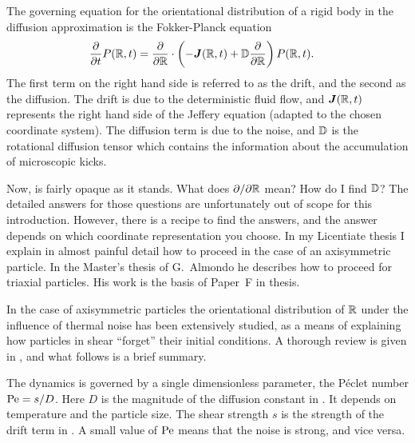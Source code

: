 \documentclass[thesis.tex]{subfiles}
\begin{document}
The governing equation for the orientational distribution of a rigid body in the diffusion approximation is the Fokker-Planck equation
\begin{align}
	\frac{\partial}{\partial t}P(\ma R, t) &= \frac{\partial}{\partial \ma R}\cdot\left(
	-\ve J (\ma R, t) + \ma D\frac{\partial}{\partial \ma R}\right)P(\ma R, t).\eqnlab{fpejeff}
\end{align}
The first term on the right hand side is referred to as the drift, and the second as the diffusion. The drift is due to the deterministic fluid flow, and $\mbox{\boldmath$J$}(\mathbb{R}, t)$ represents the right hand side of the Jeffery equation  (adapted to the chosen coordinate system). The diffusion term is due to the noise, and $\mathbb{D}$ is the rotational diffusion tensor which contains the information about the accumulation of microscopic kicks.

Now,  is fairly opaque as it stands. What does $\partial/\partial \mathbb{R}$ mean? How do I find $\mathbb{D}$? The detailed answers for those questions are unfortunately out of scope for this introduction. However, there is a recipe to find the answers, and the answer depends on which coordinate representation you choose. In my Licentiate thesis \cite{lic} I explain in almost painful detail how to proceed in the case of an axisymmetric particle. In the Master's thesis of G.~Almondo \cite{gino} he describes how to proceed for triaxial particles. His work is the basis of Paper~F in thesis.

In the case of axisymmetric particles the orientational distribution of $\mathbb{R}$ under the influence of thermal noise has been extensively studied, as a means of explaining how particles in shear ``forget'' their initial conditions. A thorough review is given in \cite{brenner1974}, and what follows is a brief summary.

The dynamics is governed by a single dimensionless parameter, the P\'eclet number $\mbox{Pe} = s/D$. Here $D$ is the magnitude of the diffusion constant in . It depends on temperature and the particle size. The shear strength $s$ is the strength of the drift term in . A small value of $\mbox{Pe}$ means that the noise is strong, and vice versa. 
\end{document}
